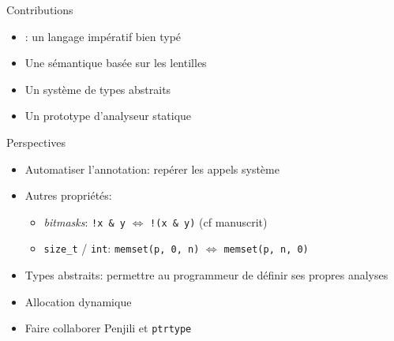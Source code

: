 \begin{frame}{Contributions}
\begin{itemize}
\item \langname: un langage impératif bien typé
\item Une sémantique basée sur les lentilles
\item Un système de types abstraits
\item Un prototype d'analyseur statique
\end{itemize}
\end{frame}

\begin{frame}{Perspectives}
    \begin{itemize}
        \item Automatiser l'annotation: repérer les appels système
        \item Autres propriétés:
            \begin{itemize}
                \item \emph{bitmasks}: \texttt{!x \& y} $⇔$ \texttt{!(x \& y)}
                    (cf manuscrit)
                \item \texttt{size\_t} / \texttt{int}: \texttt{memset(p, 0, n)} $⇔$ \texttt{memset(p, n, 0)}
            \end{itemize}
        \item Types abstraits: permettre au programmeur de définir ses propres
            analyses
        \item Allocation dynamique
        \item Faire collaborer Penjili et \texttt{ptrtype}
        \end{itemize}
\end{frame}
